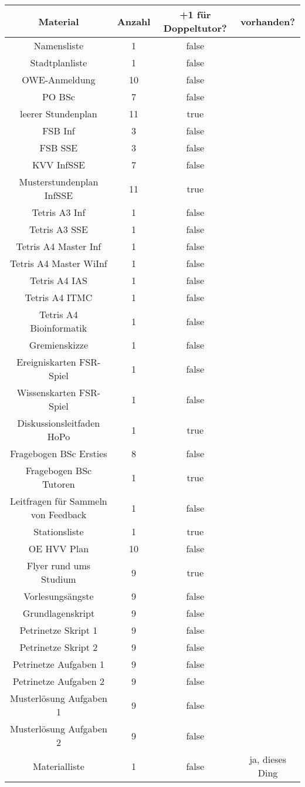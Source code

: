\documentclass[10pt,a4paper,oneside,ngerman,numbers=noenddot]{scrartcl}
\begin{document}
	\begin{tabular}{c|c|c|c}
		\textbf{Material} & \textbf{Anzahl} & \textbf{+1 für Doppeltutor?} & \textbf{vorhanden?} \\
		\hline
		Namensliste & 1 & false & \\
		\hline
		Stadtplanliste & 1 & false & \\
		\hline
		OWE-Anmeldung & 10 & false & \\
		\hline
		PO BSc & 7 & false & \\
		\hline
		leerer Stundenplan & 11 & true & \\
		\hline
		FSB Inf & 3 & false & \\
		\hline
		FSB SSE & 3 & false & \\
		\hline
		KVV InfSSE & 7 & false & \\
		\hline
		Musterstundenplan InfSSE & 11 & true & \\
		\hline
		Tetris A3 Inf & 1 & false & \\
		\hline
		Tetris A3 SSE & 1 & false & \\
		\hline
		Tetris A4 Master Inf & 1 & false & \\
		\hline
		Tetris A4 Master WiInf & 1 & false & \\
		\hline
		Tetris A4 IAS & 1 & false & \\
		\hline
		Tetris A4 ITMC & 1 & false & \\
		\hline
		Tetris A4 Bioinformatik & 1 & false & \\
		\hline
		Gremienskizze & 1 & false & \\
		\hline
		Ereigniskarten FSR-Spiel & 1 & false & \\
		\hline
		Wissenskarten FSR-Spiel & 1 & false & \\
		\hline
		Diskussionsleitfaden HoPo & 1 & true & \\
		\hline
		Fragebogen BSc Ersties & 8 & false & \\
		\hline
		Fragebogen BSc Tutoren & 1 & true & \\
		\hline
		Leitfragen für Sammeln von Feedback & 1 & false & \\
		\hline
		Stationsliste & 1 & true & \\
		\hline
		OE HVV Plan & 10 & false & \\
		\hline
		Flyer rund ums Studium & 9 & true & \\
		\hline
		Vorlesungsängste & 9 & false & \\
		\hline
		Grundlagenskript & 9 & false & \\
		\hline
		Petrinetze Skript 1 & 9 & false & \\
		\hline
		Petrinetze Skript 2 & 9 & false & \\
		\hline
		Petrinetze Aufgaben 1 & 9 & false & \\
		\hline
		Petrinetze Aufgaben 2 & 9 & false & \\
		\hline
		Musterlösung Aufgaben 1 & 9 & false & \\
		\hline
		Musterlösung Aufgaben 2 & 9 & false & \\
		\hline
		Materialliste & 1 & false & ja, dieses Ding \\
	\end{tabular}
\end{document}

